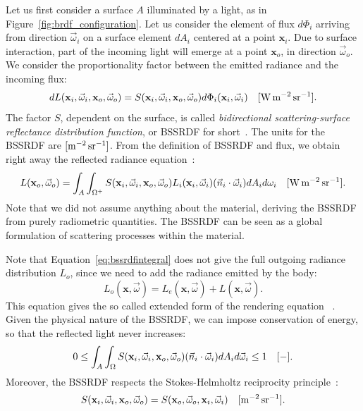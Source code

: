 Let us first consider a surface $A$ illuminated by a light, as in Figure~\ref{fig:brdf_configuration}. Let us consider the element of flux $d\Phi_i$ arriving from direction $\vec{\omega}_i$ on a surface element $d A_i$ centered at a point $\mathbf{x}_i$. Due to surface interaction, part of the incoming light will emerge at a point $\mathbf{x}_o$, in direction $\vec{\omega}_o$. We consider the proportionality factor between the emitted radiance and the incoming flux:
\begin{equation}
\label{eq:bssrdf}
d L(\mathbf{x}_i, \vec{\omega}_i, \mathbf{x}_o, \vec{\omega}_o) = S(\mathbf{x}_i, \vec{\omega}_i, \mathbf{x}_o, \vec{\omega}_o) d \Phi_i(\mathbf{x}_i, \vec{\omega}_i)  \siunit{\watt \per \square \metre \per \steradian}.
\end{equation}
The factor $S$, dependent on the surface, is called \emph{bidirectional scattering-surface reflectance distribution function}, or BSSRDF for short~\cite{Nicodemus1977}. The units for the BSSRDF are $\siunitnospace{\per \square \metre \per \steradian}$. From the definition of BSSRDF and flux, we obtain right away the reflected radiance equation~\cite{Jensen2001}:
\begin{equation}
\label{eq:bssrdfintegral}
L(\mathbf{x}_o, \vec{\omega}_o) = \int_A \int_{\Omega^+} S(\mathbf{x}_i, \vec{\omega}_i, \mathbf{x}_o, \vec{\omega}_o) L_i(\mathbf{x}_i, \vec{\omega}_i) (\vec{n}_i \cdot \vec{\omega}_i) d A_i d {\omega}_i  \siunit{\watt \per \square \metre \per \steradian}.
\end{equation}
Note that we did not assume anything about the material, deriving the BSSRDF from purely radiometric quantities. The BSSRDF can be seen as a global formulation of scattering processes within the material.

Note that Equation~\ref{eq:bssrdfintegral} does not give the full outgoing radiance distribution $L_o$, since we need to add the radiance emitted by the body:
\begin{equation*}
L_o(\mathbf{x}, \vec{\omega}) = L_e(\mathbf{x}, \vec{\omega}) + L(\mathbf{x}, \vec{\omega}) .
\end{equation*}
This equation gives the so called extended form of the rendering equation ~\cite{Jensen2001}. Given the physical nature of the BSSRDF, we can impose conservation of energy, so that the reflected light never increases:
\begin{equation}
\label{eq:bssrdfconservation}
0 \leq \int_A \int_\Omega S(\mathbf{x}_i, \vec{\omega}_i, \mathbf{x}_o, \vec{\omega}_o) (\vec{n}_i \cdot \vec{\omega}_i) d A_i d \vec{\omega}_i \leq 1 \ \ \ [\SI{}{-}].
\end{equation}
Moreover, the BSSRDF respects the Stokes-Helmholtz reciprocity principle~\cite{stokes_2009,Chandrasekhar1958}:
\begin{equation}
\label{eq:bssrdfreciprocity}
S(\mathbf{x}_i, \vec{\omega}_i, \mathbf{x}_o, \vec{\omega}_o) = 
S(\mathbf{x}_o, \vec{\omega}_o, \mathbf{x}_i, \vec{\omega}_i)  \siunit{\per \square \metre \per \steradian}.
\end{equation}

